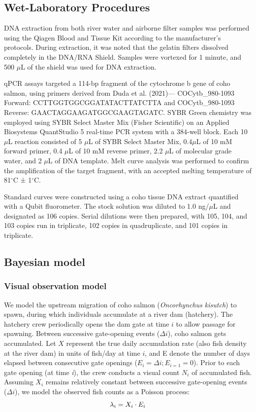 \documentclass{article}
\begin{document}
\subsection{Wet-Laboratory Procedures}
DNA extraction from both river water and airborne filter samples was performed using the Qiagen Blood and Tissue Kit according to the manufacturer’s protocols. During extraction, it was noted that the gelatin filters dissolved completely in the DNA/RNA Shield. Samples were vortexed for 1 minute, and 500 $\mu$L of the shield was used for DNA extraction.

qPCR assays targeted a 114-bp fragment of the cytochrome b gene of coho salmon, using primers derived from Duda et al. (2021)— COCytb\_980-1093 Forward: CCTTGGTGGCGGATATACTTATCTTA and COCytb\_980-1093 Reverse: GAACTAGGAAGATGGCGAAGTAGATC. SYBR Green chemistry was employed using SYBR Select Master Mix (Fisher Scientific) on an Applied Biosystems QuantStudio 5 real-time PCR system with a 384-well block. Each 10 $\mu$L reaction consisted of 5 $\mu$L of SYBR Select Master Mix, 0.4$\mu$L of 10 mM forward primer, 0.4 $\mu$L of 10 mM reverse primer, 2.2 $\mu$L of molecular grade water, and 2 $\mu$L of DNA template. Melt curve analysis was performed to confirm the amplification of the target fragment, with an accepted melting temperature of 81$^\circ$C ± 1$^\circ$C.

Standard curves were constructed using a coho tissue DNA extract quantified with a Qubit fluorometer. The stock solution was diluted to 1.0 ng/$\mu$L and designated as 106 copies. Serial dilutions were then prepared, with 105, 104, and 103 copies run in triplicate, 102 copies in quadruplicate, and 101 copies in triplicate.


\subsection{Bayesian model}
\subsubsection{Visual observation model}
We model the upstream migration of coho salmon (\textit{Oncorhynchus kisutch}) to spawn, during which individuals accumulate at a river dam (hatchery). The hatchery crew periodically opens the dam gate at time $i$ to allow passage for spawning. Between successive gate-opening events ($\Delta i$), coho salmon gets accumulated. Let $X$ represent the true daily accumulation rate (also fish density at the river dam) in units of fish/day at time $i$, and E denote the number of days elapsed between consecutive gate openings ($ E_i =\Delta i; E_{i=1} = 0$). Prior to each gate opening (at time \textit{i}), the crew conducts a visual count $N_i$ of accumulated fish.
Assuming $X_i$ remains relatively constant between successive gate-opening events ($\Delta i$), we model the observed fish counts as a Poisson process:
\begin{equation}
\lambda_i = X_i \cdot E_i \\
\end{equation}
\end{document}
